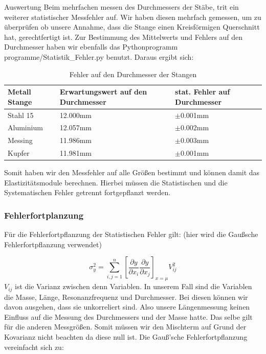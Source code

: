\documentclass[twoside]{protokoll}
\begin{document}
\begin{aufgabe}{Auswertung}
Beim mehrfachen messen des Durchmessers der Stäbe, trit ein weiterer statistischer Messfehler auf.
Wir haben diesen mehrfach gemessen, um zu überprüfen ob unsere Annahme, dass die Stange einen 
Kreisförmigen Querschnitt hat, gerechtfertigt ist.
Zur Bestimmung des Mittelwerts und Fehlers auf den Durchmesser 
haben wir ebenfalls das Pythonprogramm programme/Statistik\_Fehler.py benutzt. 
Daraus ergibt sich:\\

 \begin{table}[H]
        \centering
        \begin{tabularx}{1.0\textwidth}{X X X} %
            \toprule
            \textbf{Metall Stange} & \textbf{Erwartungswert auf den Durchmesser} & \textbf{stat. Fehler auf Durchmesser} \\
            \midrule
            Stahl 15 & 12.000mm & $\pm$0.001mm \\
            Aluminium & 12.057mm & $\pm$0.002mm  \\
            Messing & 11.986mm & $\pm$0.003mm \\
            Kupfer & 11.981mm & $\pm$0.001mm \\
            \bottomrule
        \end{tabularx}
        \caption{Fehler auf den Durchmesser der Stangen}
        \label{tab:mytable}
    \end{table}

Somit haben wir den Messfehler auf alle Größen bestimmt und können damit das Elastizitätsmodule berechnen. Hierbei müssen die Statistischen und die Systematischen Fehler getrennt fortgepflanzt werden.
\subsubsection{Fehlerfortplanzung}
Für die Fehlerfortpflanzung der Statistischen Fehler gilt: (hier wird die Gaußsche Fehlerfortpflanzung verwendet) 

\begin{equation}
	\sigma_y^2 = \sum_{i,j=1}^n\left[\frac{\partial y}{\partial x_i}\frac{\partial y}{\partial x_j}\right]_{x=\mu}V_{ij}^2
\end{equation}
$V_{ij}$ ist die Varianz zwischen denn Variablen. In unserem Fall sind die Variablen die Masse, Länge, Resonanzfrequenz und Durchmesser. 
Bei diesen können wir davon ausgehen, dass sie unkorreliert sind. 
Also unsere Längenmessung keinen Einfluss auf die Messung des Durchmessers und der Masse hatte.
Das selbe gilt für die anderen Messgrößen. 
Somit müssen wir den Mischterm auf Grund der Kovarianz nicht beachten da diese null ist.
Die Gauß'sche Fehlerfortpflanzung vereinfacht sich zu:


\end{aufgabe}
\end{document}
